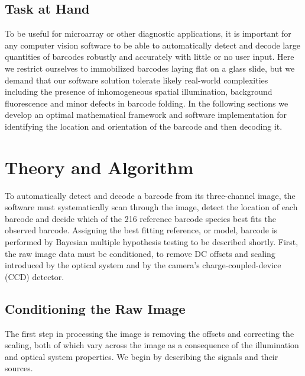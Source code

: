 \subsection{Task at Hand}
To be useful for microarray or other diagnostic applications, it is important for any computer vision software to be able to automatically detect and decode large quantities of barcodes robustly and accurately with little or no user input. 
Here we restrict ourselves to immobilized barcodes laying flat on a glass slide, but we demand that our software solution tolerate likely real-world complexities including the presence of inhomogeneous spatial illumination, background fluorescence and minor defects in barcode folding.  
In the following sections we develop an optimal mathematical framework and software implementation for identifying the location and orientation of the barcode and then decoding it.


\section{Theory and Algorithm}
To automatically detect and decode a barcode from its three-channel image, the software must systematically scan through the image, detect the location of each barcode and decide which of the 216 reference barcode species best fits the observed barcode. Assigning the best fitting reference, or model, barcode is performed by Bayesian multiple hypothesis testing to be described shortly. First, the raw image data must be conditioned, to remove DC offsets and scaling introduced by the optical system and by the camera's charge-coupled-device (CCD) detector.


\subsection{Conditioning the Raw Image}
The first step in processing the image is removing the offsets and correcting the scaling, both of which vary across the image as a consequence of the illumination and optical system properties. We begin by describing the signals and their sources.


